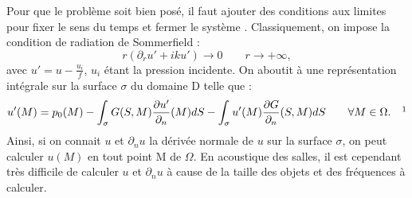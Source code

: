 %
%
Pour que le problème soit bien posé, il faut ajouter des conditions aux limites pour fixer le sens du temps et fermer le système \cite[p. 92]{BEM}. Classiquement, on impose la condition de radiation de Sommerfield :
\begin{equation}
r(\partial_ru' + iku') \to 0 \qquad r \to +\infty,
\end{equation}
avec $u' = u - \frac{u_i}{f}$, $u_i$ étant la pression incidente. On aboutit à une représentation intégrale sur la surface $\sigma$ du domaine D telle que :
\begin{equation}
u'(M) = p_0(M) - \int_\sigma G(S,M) \frac{\partial u'}{\partial_n}(M)dS -  \int_\sigma u'(M) \frac{\partial G}{\partial_n}(S,M) dS	 	\qquad  \forall M  \in \Omega.
\ \ \ \footnotemark
\end{equation}
%
Ainsi, si on connait $u$ et $\partial_n u $ la dérivée normale de $u$ sur la surface $\sigma$, on peut calculer $u(M)$ en tout point M de $\Omega$. En acoustique des salles, il est cependant très difficile de calculer $u$ et $\partial_n u $ à cause de la taille des objets et des fréquences à calculer.

